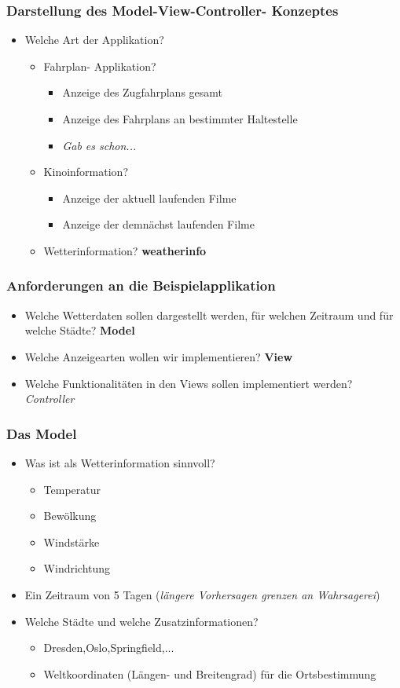 \begin{frame}
  \frametitle{Darstellung des Model-View-Controller- Konzeptes}
  \begin{itemize}
    \item Welche Art der Applikation?
    \begin{itemize}
      \item Fahrplan- Applikation?
      \begin{itemize}
        \item Anzeige des Zugfahrplans gesamt
        \item Anzeige des Fahrplans an bestimmter Haltestelle
        \item \textit{Gab es schon...}
      \end{itemize}
      \item Kinoinformation?
      \begin{itemize}
        \item Anzeige der aktuell laufenden Filme
        \item Anzeige der demn\"achst laufenden Filme
      \end{itemize}
      \item Wetterinformation? \textbf{weatherinfo}
    \end{itemize}
  \end{itemize}
\end{frame}
\begin{frame}
  \frametitle{Anforderungen an die Beispielapplikation}
  \begin{itemize}
    \item Welche Wetterdaten sollen dargestellt werden, f\"ur welchen Zeitraum und f\"ur welche St\"adte? \textbf{Model}
    \item Welche Anzeigearten wollen wir implementieren? \textbf{View}
    \item Welche Funktionalit\"aten in den Views sollen implementiert werden? \textit{Controller}
  \end{itemize}
\end{frame}
\begin{frame}
  \frametitle{Das Model}
  \begin{itemize}
    \item Was ist als Wetterinformation sinnvoll?
    \begin{itemize}
      \item Temperatur
      \item Bew\"olkung
      \item Windst\"arke
      \item Windrichtung
    \end{itemize}
    \item Ein Zeitraum von 5 Tagen (\textit{l\"angere Vorhersagen grenzen an Wahrsagerei})
    \item Welche St\"adte und welche Zusatzinformationen?
    \begin{itemize}
      \item Dresden,Oslo,Springfield,...
      \item Weltkoordinaten (L\"angen- und Breitengrad) f\"ur die Ortsbestimmung
    \end{itemize}
  \end{itemize}
\end{frame}
